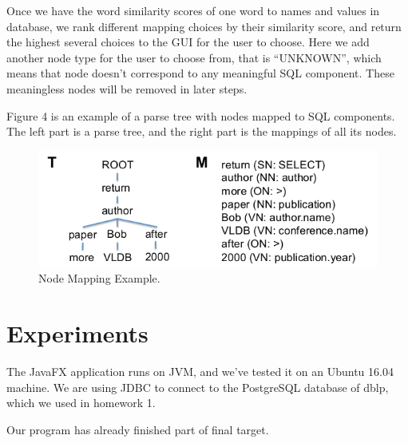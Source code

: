 \documentclass[twocolumn]{article}
\begin{document}
Once we have the word similarity scores of one word to names and values in database, we rank different mapping choices by their similarity score, and return the highest several choices to the GUI for the user to choose. Here we add another node type for the user to choose from, that is “UNKNOWN”, which means that node doesn’t correspond to any meaningful SQL component. These meaningless nodes will be removed in later steps.

Figure 4 is an example of a parse tree with nodes mapped to SQL components. The left part is a parse tree, and the right part is the mappings of all its nodes.

\begin{figure}[ht]
  \centerline{\includegraphics[width=0.9\linewidth]{figures/nodes_mapping_example.png}}
  \caption[caption for nodes mapping example]{Node Mapping Example.\protect\footnotemark }
\end{figure}



\section{Experiments}
The JavaFX application runs on JVM, and we’ve tested it on an Ubuntu 16.04 machine. We are using JDBC to connect to the PostgreSQL database of dblp, which we used in homework 1.

Our program has already finished part of final target. 
\end{document}
